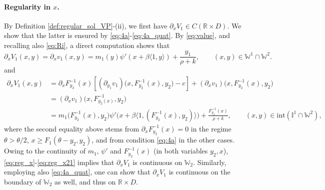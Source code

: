 \documentclass[10pt]{article}
\numberwithin{equation}{section}
\theoremstyle{plain}
\numberwithin{theorem}{section}
\theoremstyle{definition}
\def \R {\mathbb{R}}
\def \p {\partial}
\newcommand{\<}{\langle}
\renewcommand{\>}{\rangle}
\renewcommand{\(}{\left(}
\renewcommand{\)}{\right)}
\def \R  {{\mathbb {R}}}
\def \p {{\partial}}
\def \R {{\mathbb {R}}}
\begin{document}
{{\paragraph{Regularity in $x$.} By Definition \ref{def:regular_sol_VP}-(ii), we first have $\p_{x}V_1\in C(\R\times D)$. We show that the latter is ensured by \eqref{eq:4a}-\eqref{eq:4a_quat}. %
By %
\eqref{eq:value}, and recalling also \eqref{eq:Ri}, %
a direct computation shows that
\begin{equation}\label{eq:reg_x}
\p_x V_1(x,y)={\p_x v_1(x,y)}=m_1(y)\psi'(x+\beta\langle 1,y \rangle)+%
\frac{y_1}{\rho+k}, \qquad (x,y)\in \mathbb{W}^1\cap \mathbb{W}^2.
\end{equation}
and
\begin{align}
\p_x V_1(x,y)&= \p_x F^{-1}_{y_2}(x)\left[({\p_{y_1}v_1})\big(x, F^{-1}_{y_2}(x),y_2\big)-c\right]+(\p_xv_1)\big(x, F^{-1}_{y_2}(x),y_2\big)\\ 
&=(\p_xv_1)\big(x, F^{-1}_{y_2(x)},y_2\big)\label{eq:reg_x211}\\
& = m_1\big( F^{-1}_{y_2}(x),y_2\big)\psi'\big(x+\beta\big\langle 1,(F^{-1}_{y_2}(x),y_2) \big\rangle\big)+%
\frac{F^{-1}_{y_2}(x)}{\rho+k}, \qquad (x,y)\in \text{int} (\mathbb{I}^1\cap \mathbb{W}^2),
\label{eq:reg_x21}
\end{align}
where the second equality above stems from $ \p_x F^{-1}_{y_2}(x)=0$ in the regime $\theta>\theta/2$, $x\ge F_1(\theta-y_2,y_2)$, and from condition \eqref{eq:4a} in the other cases. Owing to the continuity of $m_1$, $\psi'$ and $F^{-1}_{y_2}(x)$ (in both variables $y_2,x$), \eqref{eq:reg_x}-\eqref{eq:reg_x21} implies %
that $\p_x V_1$ is continuous on $\mathbb{W}_2$. Similarly, employing also \eqref{eq:4a_quat}, one can show that $\p_x V_1$ is continuous on the boundary of $\mathbb{W}_2$ as well, and thus on $\R\times D$.

}}
\end{document}
